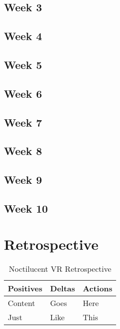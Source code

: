 \documentclass{article}
\begin{document}
\subsection{Week 3}

\subsection{Week 4}

\subsection{Week 5}

\subsection{Week 6}

\subsection{Week 7}

\subsection{Week 8}

\subsection{Week 9}

\subsection{Week 10}

\section{Retrospective}

\begin{table}[ht]
\caption{Noctilucent VR Retrospective}
\centering
\begin{tabular}{l l l}
\hline\hline
Positives & Deltas & Actions \\ [0.5ex]
\hline
Content & Goes & Here \\
Just & Like & This \\ [1ex]
\hline
\end{tabular}
\end{table}
\end{document}
